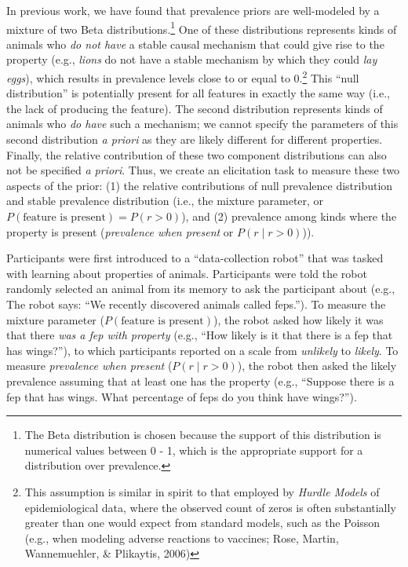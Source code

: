 \documentclass[floatsintext,man]{apa6}
\theoremstyle{definition}
\theoremstyle{definition}
\theoremstyle{definition}
\theoremstyle{remark}
\begin{document}
In previous work, we have found that prevalence priors are well-modeled
by a mixture of two Beta distributions.\footnote{The Beta distribution
  is chosen because the support of this distribution is numerical values
  between 0 - 1, which is the appropriate support for a distribution
  over prevalence.} One of these distributions represents kinds of
animals who \emph{do not have} a stable causal mechanism that could give
rise to the property (e.g., \emph{lions} do not have a stable mechanism
by which they could \emph{lay eggs}), which results in prevalence levels
close to or equal to 0.\footnote{This assumption is similar in spirit to
  that employed by \emph{Hurdle Models} of epidemiological data, where
  the observed count of zeros is often substantially greater than one
  would expect from standard models, such as the Poisson (e.g., when
  modeling adverse reactions to vaccines; Rose, Martin, Wannemuehler, \&
  Plikaytis, 2006)} This \enquote{null distribution} is potentially
present for all features in exactly the same way (i.e., the lack of
producing the feature). The second distribution represents kinds of
animals who \emph{do have} such a mechanism; we cannot specify the
parameters of this second distribution \emph{a priori} as they are
likely different for different properties. Finally, the relative
contribution of these two component distributions can also not be
specified \emph{a priori}. Thus, we create an elicitation task to
measure these two aspects of the prior: (1) the relative contributions
of null prevalence distribution and stable prevalence distribution
(i.e., the mixture parameter, or
\(P(\text{feature is present}) = P(r > 0)\)), and (2) prevalence among
kinds where the property is present (\emph{prevalence when present} or
\(P(r \mid r > 0)\))).

Participants were first introduced to a \enquote{data-collection robot}
that was tasked with learning about properties of animals. Participants
were told the robot randomly selected an animal from its memory to ask
the participant about (e.g., The robot says: \enquote{We recently
discovered animals called feps.}). To measure the mixture parameter
(\(P(\text{feature is present})\)), the robot asked how likely it was
that there \emph{was a fep with property} (e.g., \enquote{How likely is
it that there is a fep that has wings?}), to which participants reported
on a scale from \emph{unlikely} to \emph{likely}. To measure
\emph{prevalence when present} (\(P(r \mid r > 0)\)), the robot then
asked the likely prevalence assuming that at least one has the property
(e.g., \enquote{Suppose there is a fep that has wings. What percentage
of feps do you think have wings?}).
\end{document}
